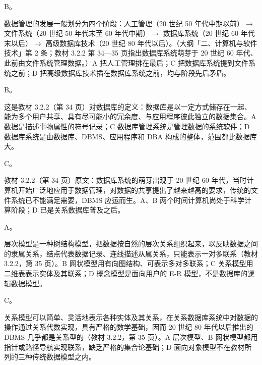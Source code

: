\documentclass[a4paper,11pt]{article}
\begin{document}


\q B。\begin{analysis}数据管理的发展一般划分为四个阶段：人工管理（20 世纪 50 年代中期以前）$\rightarrow$ 文件系统（20 世纪 50 年代末至 60 年代中期）$\rightarrow$ 数据库系统（20 世纪 60 年代末以后）$\rightarrow$ 高级数据库技术（20 世纪 80 年代以后）。（大纲「二、计算机与软件技术」第 2 条；教材 3.2.2 第 34—35 页指出数据库系统萌芽于 20 世纪 60 年代、此前由文件系统管理数据。）A 把人工管理排在最后；C 把数据库系统提到文件系统之前；D 把高级数据库技术插在数据库系统之前，均与阶段先后矛盾。\end{analysis}

\q B。\begin{analysis}这是教材 3.2.2（第 34 页）对数据库的定义：数据库是以一定方式储存在一起、能为多个用户共享、具有尽可能小的冗余度、与应用程序彼此独立的数据集合。A 数据是描述事物属性的符号记录；C 数据库管理系统是管理数据的系统软件；D 数据库系统是由数据库、DBMS、应用程序和 DBA 构成的整体，范围都比数据库大。\end{analysis}

\q C。\begin{analysis}教材 3.2.2（第 34 页）原文：数据库系统的萌芽出现于 20 世纪 60 年代，当时计算机开始广泛地应用于数据管理，对数据的共享提出了越来越高的要求，传统的文件系统已不能满足需要，DBMS 应运而生。A、B 两个时间计算机尚处于科学计算阶段；D 已是关系数据库普及之后。\end{analysis}

\q A。\begin{analysis}层次模型是一种树结构模型，把数据按自然的层次关系组织起来，以反映数据之间的隶属关系，结点代表数据记录、连线描述从属关系，只能表示一对多联系（教材 3.2.2，第 35 页）。B 网状模型用有向图结构、可表示多对多联系；C 关系模型用二维表表示实体及其联系；D 概念模型是面向用户的 E-R 模型，不是数据库的逻辑数据模型。\end{analysis}

\q C。\begin{analysis}关系模型可以简单、灵活地表示各种实体及其关系，在关系数据库系统中对数据的操作通过关系代数实现，具有严格的数学基础，因而 20 世纪 80 年代以后推出的 DBMS 几乎都是关系型的（教材 3.2.2，第 35 页）。A 层次模型、B 网状模型都用指针或路径导航实现联系，缺乏严格的集合论基础；D 面向对象模型不在教材所列的三种传统数据模型之内。\end{analysis}
\end{document}
